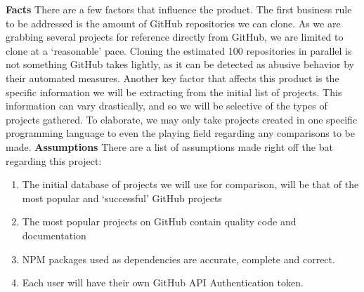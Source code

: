 \documentclass{article}
\begin{document}
\noindent
\textbf{Facts}
\newline
\newline
There are a few factors that influence the product. The first business rule to be addressed is the amount of GitHub repositories we can clone. As we are grabbing several projects for reference directly from GitHub, we are limited to clone at a ‘reasonable’ pace. Cloning the estimated 100 repositories in parallel is not something GitHub takes lightly, as it can be detected as abusive behavior by their automated measures. Another key factor that affects this product is the specific information we will be extracting from the initial list of projects. This information can vary drastically, and so we will be selective of the types of projects gathered. To elaborate, we may only take projects created in one specific programming language to even the playing field regarding any comparisons to be made.
\newline
\newline 
\textbf{Assumptions}
\newline
\newline 
There are a list of assumptions made right off the bat regarding this project:
\begin{enumerate}
\item The initial database of projects we will use for comparison, will be that of the most popular and ‘successful’ GitHub projects
\item The most popular projects on GitHub contain quality code and documentation
\item NPM packages used as dependencies are accurate, complete and correct. 
\item Each user will have their own GitHub API Authentication token. 

\end{enumerate}

\end{document}
